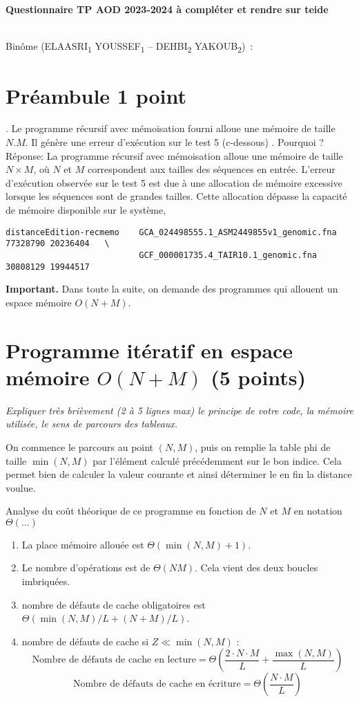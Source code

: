 \documentclass[10pt,a4paper]{article}
\begin{document}
\thispagestyle{empty}

\noindent\centerline{\bf\large Questionnaire  TP AOD 2023-2024 à compléter et rendre sur teide  } \\
Binôme 
(ELAASRI\textsubscript{1} YOUSSEF\textsubscript{1} --
 DEHBI\textsubscript{2} YAKOUB\textsubscript{2})
\,: \dotfill

\section{Préambule 1 point}.
Le programme récursif avec mémoisation fourni alloue une mémoire de taille $N.M$.
Il génère une erreur d'exécution sur le test 5 (c-dessous) . Pourquoi ? \\
Réponse:   La programme récursif avec mémoisation alloue une mémoire de taille $N \times M$, où $N$ et $M$ correspondent aux tailles des séquences en entrée. L'erreur d'exécution observée sur le test 5 est due à une allocation de mémoire excessive lorsque les séquences sont de grandes tailles. Cette allocation dépasse la capacité de mémoire disponible sur le système,
\begin{verbatim}
distanceEdition-recmemo    GCA_024498555.1_ASM2449855v1_genomic.fna 77328790 20236404   \
                           GCF_000001735.4_TAIR10.1_genomic.fna 30808129 19944517 
\end{verbatim}

{\noindent\bf{Important}.} Dans toute la suite, on demande des programmes qui allouent un espace mémoire $O(N+M)$.

\section{Programme itératif en espace mémoire $O(N+M)$ (5 points)}
{\em Expliquer très brièvement (2 à 5 lignes max) le principe de votre code, la mémoire utilisée, le sens de parcours des tableaux.}
\vspace*{1.0cm}

On commence le parcours au point $(N, M)$, puis on remplie la table phi de taille $\min(N,M)$ par l'élément calculé précédemment sur le bon indice. Cela permet bien de calculer la valeur courante et ainsi déterminer le en fin la distance voulue.

\vspace*{1.0cm}

Analyse du coût théorique de ce  programme en fonction de $N$ et $M$  en notation $\Theta(...)$ 
\begin{enumerate}
  \item La place mémoire allouée est $\Theta(\min(N,M) + 1)$.
  \item Le nombre d'opérations est de $\Theta(NM)$. Cela vient des deux boucles imbriquées. 
  \item nombre de défauts de cache obligatoires est $\Theta(\min(N, M)/L + (N + M)/L)$.
  \item nombre de défauts de cache si $Z \ll \min(N,M)$ : 
  \[
\text{Nombre de défauts de cache en lecture} = \Theta(\frac{2 \cdot N \cdot M}{L} + \frac{\max(N, M)}{L})
\]
  \[
\text{Nombre de défauts de cache en écriture} = \Theta(\frac{ N \cdot M}{L})
\]
\end{enumerate}
\end{document}
